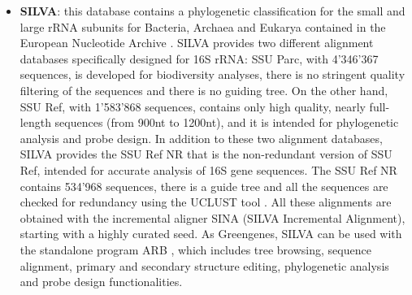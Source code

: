 \begin{itemize}
\item \textbf{SILVA}: this database contains a phylogenetic classification for the small and large rRNA subunits for Bacteria, Archaea and Eukarya contained in the European Nucleotide Archive \cite{leinonen2010european}. SILVA provides two different alignment databases specifically designed for 16S rRNA: SSU Parc, with 4'346'367 sequences, is developed for biodiversity analyses, there is no stringent quality filtering of the sequences and there is no guiding tree. On the other hand, SSU Ref, with 1'583'868 sequences, contains only high quality, nearly full-length sequences (from 900nt to 1200nt), and it is intended for phylogenetic analysis and probe design. In addition to these two alignment databases, SILVA provides the SSU Ref NR that is the non-redundant version of SSU Ref, intended for accurate analysis of 16S gene sequences. The SSU Ref NR contains 534'968 sequences, there is a guide tree and all the sequences are checked for redundancy using the UCLUST tool \cite{edgar2010search}. All these alignments are obtained with the incremental aligner SINA (SILVA Incremental Alignment), starting with a highly curated seed. As Greengenes, SILVA can be used with the standalone program ARB \cite{ludwig2004arb}, which includes tree browsing, sequence alignment, primary and secondary structure editing, phylogenetic analysis and probe design functionalities. 

\end{itemize}

\backmatter
{}
\renewcommand{\sectionmark}[1]{\markright{#1}}
\sectionmark{Bibliography}
